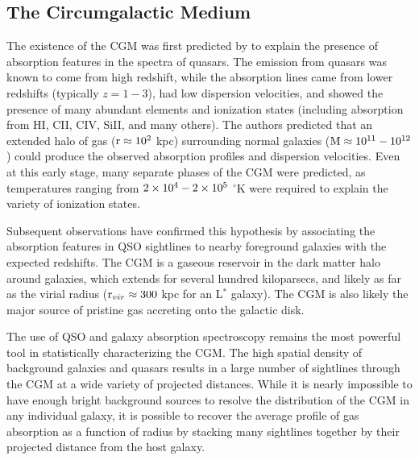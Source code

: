 \subsection{The Circumgalactic Medium}
\label{sec:Galaxy.CGM}

The existence of the CGM was first predicted by \citet{Bahcall1969} to
explain the presence of absorption features in the spectra of
quasars. The emission from quasars was known to come from high
redshift, while the absorption lines came from lower redshifts
(typically $z = 1-3$), had low dispersion velocities, and showed the
presence of many abundant elements and ionization states (including
absorption from HI, CII, CIV, SiII, and many others). The authors
predicted that an extended halo of gas ($\textrm{r}{} \approx 10^2$ kpc)
surrounding normal galaxies ($\textrm{M}{} \approx 10^{11}-10^{12}$ \Msun)
could produce the observed absorption profiles and dispersion
velocities. Even at this early stage, many separate phases of the CGM
were predicted, as temperatures ranging from $2\times 10^{4} - 2\times 10^{5}$
$^\circ{}$K were required to explain the variety of ionization states.

Subsequent observations have confirmed this hypothesis by associating
the absorption features in QSO sightlines to nearby foreground
galaxies with the expected redshifts. The CGM is a gaseous reservoir
in the dark matter halo around galaxies, which extends for several
hundred kiloparsecs, and likely as far as the virial radius
($\textrm{r\ensuremath{_{vir}}}{}\approx 300$ kpc for an L$^*$ galaxy). The CGM is also likely
the major source of pristine gas accreting onto the galactic disk. 

The use of QSO and galaxy absorption spectroscopy remains the most
powerful tool in statistically characterizing the CGM. The high
spatial density of background galaxies and quasars results in a large
number of sightlines through the CGM at a wide variety of projected
distances. While it is nearly impossible to have enough bright
background sources to resolve the distribution of the CGM in any
individual galaxy, it is possible to recover the average profile of
gas absorption as a function of radius by stacking many sightlines
together by their projected distance from the host galaxy.

